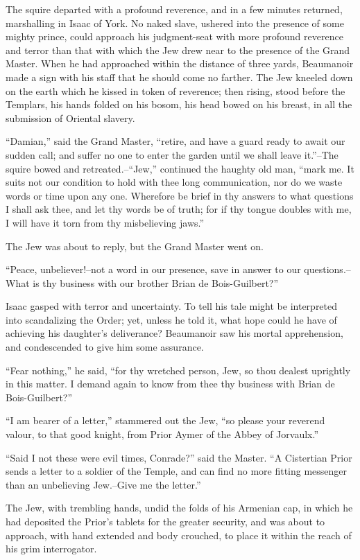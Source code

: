 The squire departed with a profound reverence, and in a few minutes
returned, marshalling in Isaac of York. No naked slave, ushered into the
presence of some mighty prince, could approach his judgment-seat with
more profound reverence and terror than that with which the Jew drew
near to the presence of the Grand Master. When he had approached within
the distance of three yards, Beaumanoir made a sign with his staff that
he should come no farther. The Jew kneeled down on the earth which he
kissed in token of reverence; then rising, stood before the Templars,
his hands folded on his bosom, his head bowed on his breast, in all the
submission of Oriental slavery.

``Damian,'' said the Grand Master, ``retire, and have a guard ready to
await our sudden call; and suffer no one to enter the garden until we
shall leave it.''--The squire bowed and retreated.--``Jew,'' continued
the haughty old man, ``mark me. It suits not our condition to hold with
thee long communication, nor do we waste words or time upon any one.
Wherefore be brief in thy answers to what questions I shall ask thee,
and let thy words be of truth; for if thy tongue doubles with me, I will
have it torn from thy misbelieving jaws.''

The Jew was about to reply, but the Grand Master went on.

``Peace, unbeliever!--not a word in our presence, save in answer to our
questions.--What is thy business with our brother Brian de
Bois-Guilbert?''

Isaac gasped with terror and uncertainty. To tell his tale might be
interpreted into scandalizing the Order; yet, unless he told it, what
hope could he have of achieving his daughter's deliverance? Beaumanoir
saw his mortal apprehension, and condescended to give him some
assurance.

``Fear nothing,'' he said, ``for thy wretched person, Jew, so thou
dealest uprightly in this matter. I demand again to know from thee thy
business with Brian de Bois-Guilbert?''

``I am bearer of a letter,'' stammered out the Jew, ``so please your
reverend valour, to that good knight, from Prior Aymer of the Abbey of
Jorvaulx.''

``Said I not these were evil times, Conrade?'' said the Master. ``A
Cistertian Prior sends a letter to a soldier of the Temple, and can find
no more fitting messenger than an unbelieving Jew.--Give me the
letter.''

The Jew, with trembling hands, undid the folds of his Armenian cap, in
which he had deposited the Prior's tablets for the greater security, and
was about to approach, with hand extended and body crouched, to place it
within the reach of his grim interrogator.

